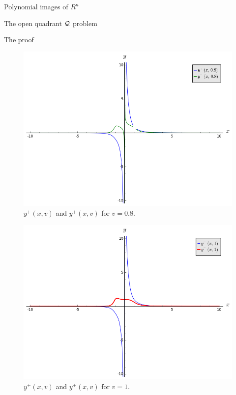 \documentclass[11pt, a4paper, english, twoside, notitlepage]{report}
\begin{document}
\begin{chapter}{Polynomial images of $R^n$}
\begin{section}{The open quadrant $\mathcal{Q}$ problem}
\begin{subsection}{The proof}
\begin{Proof}
			\begin{figure}
				\centering
				\includegraphics[width=1\textwidth]{plots/ch1_06_sols.png}
				\caption{$y^+(x,v)$ and $y^+(x,v)$ for $v = 0.8$.\label{fig:plotYs_1}}
			\end{figure}
			
			\begin{figure}
				\centering
				\includegraphics[width=1\textwidth]{plots/ch1_07_sols_1.png}
				\caption{$y^+(x,v)$ and $y^+(x,v)$ for $v = 1$.\label{fig:plotYs_2}}
			\end{figure}


\end{Proof}
\end{subsection}
\end{section}
\end{chapter}
\end{document}
